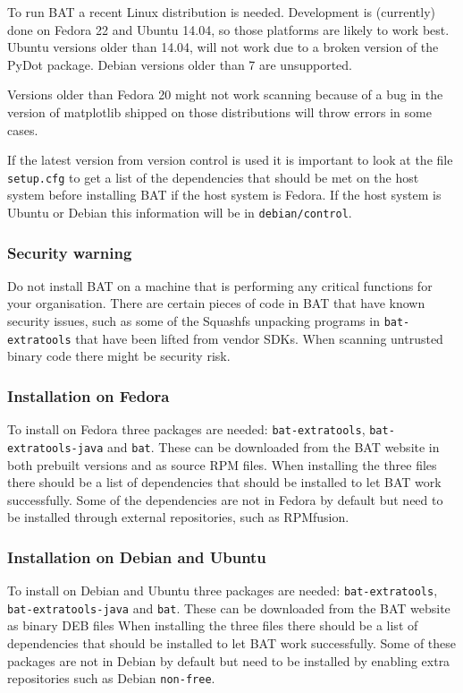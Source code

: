 \documentclass[10pt,a4paper]{article}
\begin{document}
To run BAT a recent Linux distribution is needed. Development is (currently)
done on Fedora 22 and Ubuntu 14.04, so those platforms are likely to
work best. Ubuntu versions older than 14.04, will not work due to a broken
version of the PyDot package. Debian versions older than 7 are unsupported.

Versions older than Fedora 20 might not work scanning because of a bug in the
version of matplotlib shipped on those distributions will throw errors in some
cases.

If the latest version from version control is used it is important to look at
the file \texttt{setup.cfg} to get a list of the dependencies that should be
met on the host system before installing BAT if the host system is Fedora. If
the host system is Ubuntu or Debian this information will be in
\texttt{debian/control}.

\subsubsection{Security warning}

Do not install BAT on a machine that is performing any critical functions for
your organisation. There are certain pieces of code in BAT that have known
security issues, such as some of the Squashfs unpacking programs in
\texttt{bat-extratools} that have been lifted from vendor SDKs. When scanning
untrusted binary code there might be security risk.

\subsubsection{Installation on Fedora}

To install on Fedora three packages are needed:
\texttt{bat-extratools}, \texttt{bat-extratools-java} %
and \texttt{bat}. These can be downloaded from the BAT website in both prebuilt
versions and as source RPM files. When installing the three files there should
be a list of dependencies that should be installed to let BAT work successfully.
Some of the dependencies are not in Fedora by default but need to be installed
through external repositories, such as RPMfusion.

\subsubsection{Installation on Debian and Ubuntu}

To install on Debian and Ubuntu three packages are needed:
\texttt{bat-extratools}, \texttt{bat-extratools-java} %
and \texttt{bat}. These can be downloaded from the BAT website as binary DEB
files When installing the three files there should be a list of dependencies
that should be installed to let BAT work successfully. Some of these packages
are not in Debian by default but need to be installed by enabling extra
repositories such as Debian \texttt{non-free}.
\end{document}
